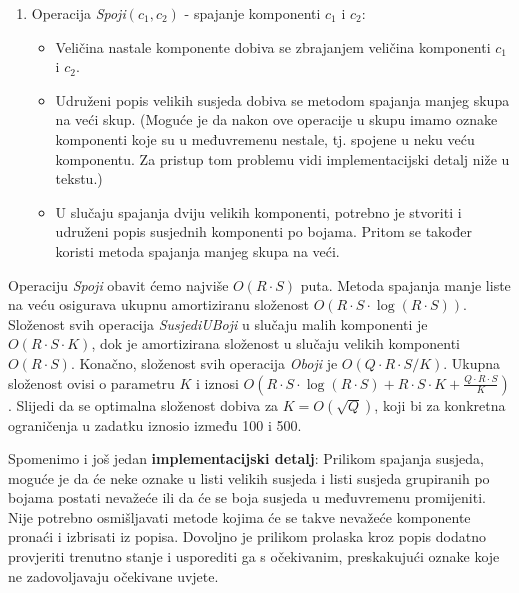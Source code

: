 \begin{enumerate}
  \item Operacija \textit{Spoji}$(c_1, c_2)$ - spajanje komponenti $c_1$ i $c_2$:
    \begin{itemize}[topsep=0pt]
      \item Veličina nastale komponente dobiva se zbrajanjem veličina komponenti
        $c_1$ i $c_2$.
      \item Udruženi popis velikih susjeda dobiva se metodom spajanja manjeg
        skupa na veći skup. (Moguće je da nakon ove operacije u skupu imamo
        oznake komponenti koje su u međuvremenu nestale, tj. spojene u neku
        veću komponentu. Za pristup tom problemu vidi implementacijski detalj
        niže u tekstu.)
      \item U slučaju spajanja dviju velikih komponenti, potrebno je stvoriti
        i udruženi popis susjednih komponenti po bojama. Pritom se također
        koristi metoda spajanja manjeg skupa na veći.
    \end{itemize}
\end{enumerate}

Operaciju \textit{Spoji} obavit ćemo najviše $O(R \cdot S)$ puta. Metoda spajanja
manje liste na veću osigurava ukupnu amortiziranu složenost $O(R \cdot S \cdot \log (R \cdot S))$.
Složenost svih operacija \textit{SusjediUBoji} u slučaju malih komponenti je
$O(R \cdot S \cdot K)$, dok je amortizirana složenost u slučaju velikih komponenti
$O(R \cdot S)$. Konačno, složenost svih operacija \textit{Oboji} je $O(Q \cdot R \cdot S / K)$. Ukupna
složenost ovisi o parametru $K$ i iznosi $O(R \cdot S \cdot \log(R \cdot S) + R \cdot S \cdot K + \frac{Q \cdot R \cdot S}{K})$.
Slijedi da se optimalna složenost dobiva za $K = O(\sqrt{Q})$,
koji bi za konkretna ograničenja u zadatku iznosio između 100 i 500.

Spomenimo i još jedan \textbf{implementacijski detalj}: Prilikom spajanja susjeda,
moguće je da će neke oznake u listi velikih susjeda i listi susjeda grupiranih
po bojama postati nevažeće ili da će se boja susjeda u međuvremenu promijeniti.
Nije potrebno osmišljavati metode kojima će se takve nevažeće komponente pronaći
i izbrisati iz popisa. Dovoljno je prilikom prolaska kroz popis dodatno provjeriti
trenutno stanje i usporediti ga s očekivanim, preskakujući oznake koje ne
zadovoljavaju očekivane uvjete.
